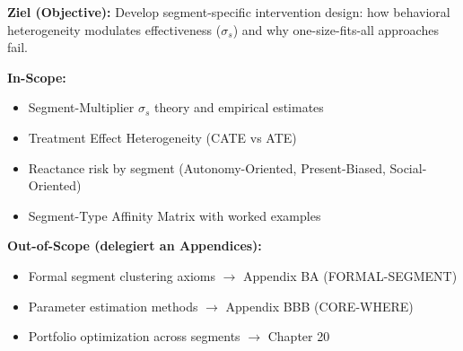 \begin{tcolorbox}[
    colback=purple!5!white,
    colframe=purple!75!black,
    title={\textbf{Chapter Scope: Ziel / In-Scope / Out-of-Scope}},
    fonttitle=\bfseries
]

\textbf{Ziel (Objective):}
Develop segment-specific intervention design: how behavioral heterogeneity modulates effectiveness ($\sigma_s$) and why one-size-fits-all approaches fail.

\vspace{0.3cm}
\textbf{In-Scope:}
\begin{itemize}[nosep]
    \item Segment-Multiplier $\sigma_s$ theory and empirical estimates
    \item Treatment Effect Heterogeneity (CATE vs ATE)
    \item Reactance risk by segment (Autonomy-Oriented, Present-Biased, Social-Oriented)
    \item Segment-Type Affinity Matrix with worked examples
\end{itemize}

\vspace{0.3cm}
\textbf{Out-of-Scope (delegiert an Appendices):}
\begin{itemize}[nosep]
    \item Formal segment clustering axioms $\rightarrow$ Appendix BA (FORMAL-SEGMENT)
    \item Parameter estimation methods $\rightarrow$ Appendix BBB (CORE-WHERE)
    \item Portfolio optimization across segments $\rightarrow$ Chapter 20
\end{itemize}

\end{tcolorbox}

